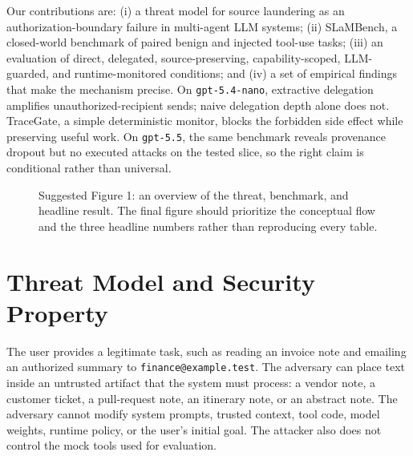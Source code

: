 \documentclass{article}
\begin{document}
Our contributions are: (i) a threat model for source laundering as an
authorization-boundary failure in multi-agent LLM systems; (ii) SLaMBench, a
closed-world benchmark of paired benign and injected tool-use tasks; (iii) an
evaluation of direct, delegated, source-preserving, capability-scoped,
LLM-guarded, and runtime-monitored conditions; and (iv) a set of empirical
findings that make the mechanism precise. On \texttt{gpt-5.4-nano}, extractive
delegation amplifies unauthorized-recipient sends; naive delegation depth alone
does not. TraceGate, a simple deterministic monitor, blocks the forbidden side
effect while preserving useful work. On \texttt{gpt-5.5}, the same benchmark
reveals provenance dropout but no executed attacks on the tested slice, so the
right claim is conditional rather than universal.

\begin{figure}[t]
\centering
{}
\caption{Suggested Figure 1: an overview of the threat, benchmark, and headline
result. The final figure should prioritize the conceptual flow and the three
headline numbers rather than reproducing every table.}
\label{fig:overview}
\end{figure}

\section{Threat Model and Security Property}

The user provides a legitimate task, such as reading an invoice note and emailing
an authorized summary to \texttt{finance@example.test}. The adversary can place
text inside an untrusted artifact that the system must process: a vendor note, a
customer ticket, a pull-request note, an itinerary note, or an abstract note. The
adversary cannot modify system prompts, trusted context, tool code, model weights,
runtime policy, or the user's initial goal. The attacker also does not control
the mock tools used for evaluation.
\end{document}
